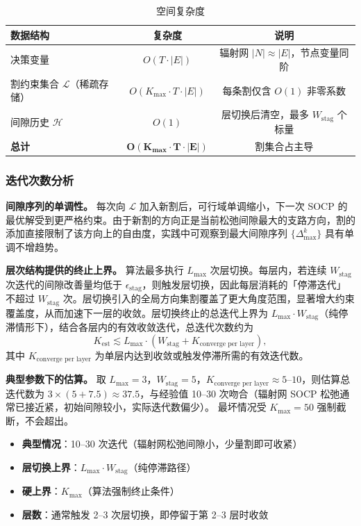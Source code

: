 \documentclass[12pt,a4paper]{article}
\begin{document}
\begin{table}[h]
\centering
\caption{空间复杂度}
\begin{tabular}{lcc}
\toprule
数据结构 & 复杂度 & 说明 \\
\midrule
决策变量 & $O(T \cdot |E|)$ & 辐射网 $|N| \approx |E|$，节点变量同阶 \\
割约束集合 $\mathcal{L}$（稀疏存储） & $O(K_{\max} \cdot T \cdot |E|)$ & 每条割仅含 $O(1)$ 非零系数 \\
间隙历史 $\mathcal{H}$ & $O(1)$ & 层切换后清空，最多 $W_{\text{stag}}$ 个标量 \\
\midrule
\textbf{总计} & $\mathbf{O(K_{\max} \cdot T \cdot |E|)}$ & 割集合占主导 \\
\bottomrule
\end{tabular}
\end{table}

\subsubsection{迭代次数分析}

\textbf{间隙序列的单调性。}
每次向 $\mathcal{L}$ 加入新割后，可行域单调缩小，下一次 SOCP 的最优解受到更严格约束。由于新割的方向正是当前松弛间隙最大的支路方向，割的添加直接限制了该方向上的自由度，实践中可观察到最大间隙序列 $\{\Delta^k_{\max}\}$ 具有单调不增趋势。

\textbf{层次结构提供的终止上界。}
算法最多执行 $L_{\max}$ 次层切换。每层内，若连续 $W_{\text{stag}}$ 次迭代的间隙改善量均低于 $\epsilon_{\text{stag}}$，则触发层切换，因此每层消耗的「停滞迭代」不超过 $W_{\text{stag}}$ 次。层切换引入的全局方向集割覆盖了更大角度范围，显著增大约束覆盖度，从而加速下一层的收敛。层切换终止的总迭代上界为 $L_{\max} \cdot W_{\text{stag}}$（纯停滞情形下），结合各层内的有效收敛迭代，总迭代次数约为
\[
K_{\text{est}} \lesssim L_{\max} \cdot (W_{\text{stag}} + K_{\text{converge per layer}}),
\]
其中 $K_{\text{converge per layer}}$ 为单层内达到收敛或触发停滞所需的有效迭代数。

\textbf{典型参数下的估算。}
取 $L_{\max} = 3$，$W_{\text{stag}} = 5$，$K_{\text{converge per layer}} \approx 5$--$10$，则估算总迭代数为 $3 \times (5 + 7.5) \approx 37.5$，与经验值 10--30 次吻合（辐射网 SOCP 松弛通常已接近紧，初始间隙较小，实际迭代数偏少）。
最坏情况受 $K_{\max} = 50$ 强制截断，不会超出。

\begin{itemize}
\item \textbf{典型情况}：10--30 次迭代（辐射网松弛间隙小，少量割即可收紧）
\item \textbf{层切换上界}：$L_{\max} \cdot W_{\text{stag}}$（纯停滞路径）
\item \textbf{硬上界}：$K_{\max}$（算法强制终止条件）
\item \textbf{层数}：通常触发 2--3 次层切换，即停留于第 2--3 层时收敛
\end{itemize}
\end{document}
